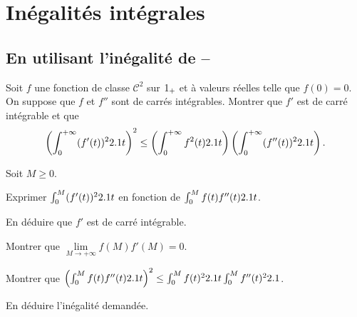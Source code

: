 \section{Inégalités intégrales}

\subsection{En utilisant l'inégalité de --}




\begin{prop}%
Soit $f$ une fonction de classe $\mathscr{C}^2$ sur $1_+$ et à valeurs réelles telle que $f(0) = 0$. On suppose que $f$ et $f''$ sont de carrés intégrables. Montrer que $f'$ est de carré intégrable et que
\[
\left(\int_0^{+\infty} (f'(t))^22.1 t \right)^2
\leq
\left(\int_0^{+\infty} f^2(t) 2.1 t\right)
\left(\int_0^{+\infty} (f''(t))^2 2.1 t\right).
\]
\end{prop}

\begin{exercice}
Soit $M \geq 0$.
\begin{questions}
\item Exprimer $\int_0^M (f'(t))^2 2.1 t$ en fonction de $\int_0^M f(t) f''(t) 2.1 t$.

\item En déduire que $f'$ est de carré intégrable.

\item Montrer que $\lim\limits_{M\to+\infty} f(M) f'(M) = 0$.

\item Montrer que $\left(\int_0^M f(t) f''(t) 2.1 t\right)^2 \leq \int_0^M f(t)^2 2.1 t \int_0^M f''(t)^2 2.1 $.

\item En déduire l'inégalité demandée.
\end{questions}
\end{exercice}

